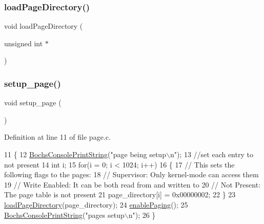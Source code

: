 \subsubsection{\texorpdfstring{load\+Page\+Directory()}{loadPageDirectory()}}
{\footnotesize\ttfamily void load\+Page\+Directory (\begin{DoxyParamCaption}\item[{unsigned int $\ast$}]{ }\end{DoxyParamCaption})}

\mbox{\label{a00047_a51f6a37816540dea572d38f2713e9f5a_a51f6a37816540dea572d38f2713e9f5a}} 
\subsubsection{\texorpdfstring{setup\+\_\+page()}{setup\_page()}}
{\footnotesize\ttfamily void setup\+\_\+page (\begin{DoxyParamCaption}{ }\end{DoxyParamCaption})}



Definition at line 11 of file page.\+c.


\begin{DoxyCode}
11                   \{
12     \hyperlink{a00017_a19e1f554d03c977f8b947f21489daa41_a19e1f554d03c977f8b947f21489daa41}{BochsConsolePrintString}(\textcolor{stringliteral}{"page being setup\(\backslash\)n"});
13     \textcolor{comment}{//set each entry to not present}
14     \textcolor{keywordtype}{int} i;
15     \textcolor{keywordflow}{for}(i = 0; i < 1024; i++)
16     \{
17         \textcolor{comment}{// This sets the following flags to the pages:}
18         \textcolor{comment}{//   Supervisor: Only kernel-mode can access them}
19         \textcolor{comment}{//   Write Enabled: It can be both read from and written to}
20         \textcolor{comment}{//   Not Present: The page table is not present}
21         page\_directory[i] = 0x00000002;
22     \}
23     \hyperlink{a00047_abfdf37b9c42cafa83b39f1a41264989c_abfdf37b9c42cafa83b39f1a41264989c}{loadPageDirectory}(page\_directory);
24     \hyperlink{a00047_a8fe3a9cca4b2ccd7a2743e9943880a32_a8fe3a9cca4b2ccd7a2743e9943880a32}{enablePaging}();
25     \hyperlink{a00017_a19e1f554d03c977f8b947f21489daa41_a19e1f554d03c977f8b947f21489daa41}{BochsConsolePrintString}(\textcolor{stringliteral}{"pages setup\(\backslash\)n"});
26 \}
\end{DoxyCode}
